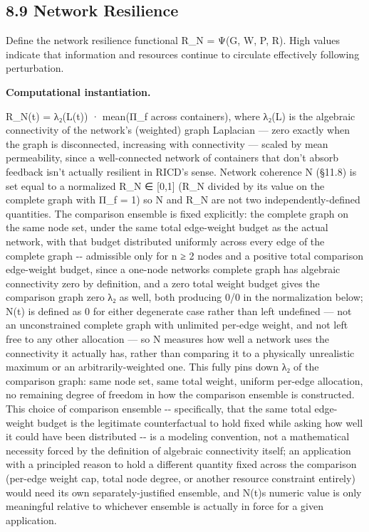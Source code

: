 \documentclass[
]{article}
\begin{document}
\hypertarget{network-resilience}{%
\subsection{8.9 Network Resilience}\label{network-resilience}}

Define the network resilience functional R\_N = Ψ(G, W, P, R). High
values indicate that information and resources continue to circulate
effectively following perturbation.

\textbf{Computational instantiation.}

R\_N(t) = λ₂(L(t)) · mean(Π\_f across containers), where λ₂(L) is the
algebraic connectivity of the network's (weighted) graph Laplacian ---
zero exactly when the graph is disconnected, increasing with
connectivity --- scaled by mean permeability, since a well-connected
network of containers that don't absorb feedback isn't actually
resilient in RICD's sense. Network coherence N (§11.8) is set equal to a
normalized R\_N ∈ {[}0,1{]} (R\_N divided by its value on the complete
graph with Π\_f = 1) so N and R\_N are not two independently-defined
quantities. The comparison ensemble is fixed explicitly: the complete
graph on the same node set, under the same total edge-weight budget as
the actual network, with that budget distributed uniformly across every
edge of the complete graph -\/- admissible only for n ≥ 2 nodes and a
positive total comparison edge-weight budget, since a one-node networks
complete graph has algebraic connectivity zero by definition, and a zero
total weight budget gives the comparison graph zero λ₂ as well, both
producing 0/0 in the normalization below; N(t) is defined as 0 for
either degenerate case rather than left undefined --- not an
unconstrained complete graph with unlimited per-edge weight, and not
left free to any other allocation --- so N measures how well a network
uses the connectivity it actually has, rather than comparing it to a
physically unrealistic maximum or an arbitrarily-weighted one. This
fully pins down λ₂ of the comparison graph: same node set, same total
weight, uniform per-edge allocation, no remaining degree of freedom in
how the comparison ensemble is constructed. This choice of comparison
ensemble -\/- specifically, that the same total edge-weight budget is
the legitimate counterfactual to hold fixed while asking how well it
could have been distributed -\/- is a modeling convention, not a
mathematical necessity forced by the definition of algebraic
connectivity itself; an application with a principled reason to hold a
different quantity fixed across the comparison (per-edge weight cap,
total node degree, or another resource constraint entirely) would need
its own separately-justified ensemble, and N(t)\textquotesingle s
numeric value is only meaningful relative to whichever ensemble is
actually in force for a given application.
\end{document}
